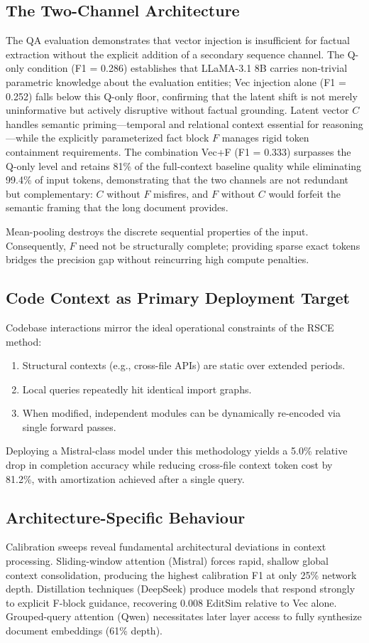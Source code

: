 \documentclass[11pt]{article}
\begin{document}
\subsection{The Two-Channel Architecture}
The QA evaluation demonstrates that vector injection is insufficient for factual extraction without the explicit addition of a secondary sequence channel. The Q-only condition (F1 = 0.286) establishes that LLaMA-3.1 8B carries non-trivial parametric knowledge about the evaluation entities; Vec injection alone (F1 = 0.252) falls below this Q-only floor, confirming that the latent shift is not merely uninformative but actively disruptive without factual grounding. Latent vector $C$ handles semantic priming---temporal and relational context essential for reasoning---while the explicitly parameterized fact block $F$ manages rigid token containment requirements. The combination Vec+F (F1 = 0.333) surpasses the Q-only level and retains 81\% of the full-context baseline quality while eliminating 99.4\% of input tokens, demonstrating that the two channels are not redundant but complementary: $C$ without $F$ misfires, and $F$ without $C$ would forfeit the semantic framing that the long document provides.

Mean-pooling destroys the discrete sequential properties of the input. Consequently, $F$ need not be structurally complete; providing sparse exact tokens bridges the precision gap without reincurring high compute penalties.

\subsection{Code Context as Primary Deployment Target}
Codebase interactions mirror the ideal operational constraints of the RSCE method:
\begin{enumerate}
    \item Structural contexts (e.g., cross-file APIs) are static over extended periods.
    \item Local queries repeatedly hit identical import graphs.
    \item When modified, independent modules can be dynamically re-encoded via single forward passes.
\end{enumerate}
Deploying a Mistral-class model under this methodology yields a 5.0\% relative drop in completion accuracy while reducing cross-file context token cost by 81.2\%, with amortization achieved after a single query.

\subsection{Architecture-Specific Behaviour}
Calibration sweeps reveal fundamental architectural deviations in context processing. Sliding-window attention (Mistral) forces rapid, shallow global context consolidation, producing the highest calibration F1 at only 25\% network depth. Distillation techniques (DeepSeek) produce models that respond strongly to explicit F-block guidance, recovering 0.008 EditSim relative to Vec alone. Grouped-query attention (Qwen) necessitates later layer access to fully synthesize document embeddings (61\% depth).
\end{document}
